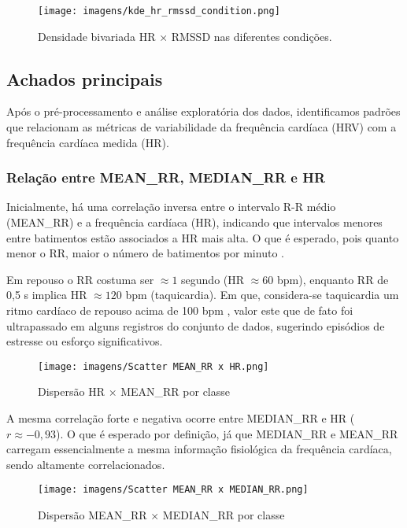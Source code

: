 \documentclass[conference]{IEEEtran}
\begin{document}
\begin{figure}[htbp]
    \centering
    \texttt{[image: imagens/kde\_hr\_rmssd\_condition.png]}
    \caption{Densidade bivariada HR × RMSSD nas diferentes condições.}
    \label{fig:kdrhr_rmssd}
\end{figure}

\subsection{Achados principais}

Após o pré-processamento e análise exploratória dos dados, identificamos padrões que relacionam as métricas de variabilidade da frequência cardíaca (HRV) com a frequência cardíaca medida (HR).

\subsubsection{Relação entre MEAN\_RR, MEDIAN\_RR e HR}

Inicialmente, há uma correlação inversa entre o intervalo R-R médio (MEAN\_RR) e a frequência cardíaca (HR), indicando que intervalos menores entre batimentos estão associados a HR mais alta. O que é esperado, pois quanto menor o RR, maior o número de batimentos por minuto \cite{R1}.

Em repouso o RR costuma ser $\approx1$ segundo (HR $\approx60$ bpm), enquanto RR de 0,5 s implica HR $\approx120$ bpm (taquicardia). Em que, considera-se taquicardia um ritmo cardíaco de repouso acima de 100 bpm \cite{R2}, valor este que de fato foi ultrapassado em alguns registros do conjunto de dados, sugerindo episódios de estresse ou esforço significativos.

\begin{figure}[htbp]
    \centering
    \texttt{[image: imagens/Scatter MEAN\_RR x HR.png]}
    \caption{Dispersão HR × MEAN\_RR por classe}
    \label{fig:hrmedian_rr}
\end{figure}

A mesma correlação forte e negativa ocorre entre MEDIAN\_RR e HR ($r\approx -0,93$). O que é esperado por definição, já que MEDIAN\_RR e MEAN\_RR carregam essencialmente a mesma informação fisiológica da frequência cardíaca, sendo altamente correlacionados.

\begin{figure}[htbp]
    \centering
    \texttt{[image: imagens/Scatter MEAN\_RR x MEDIAN\_RR.png]}
    \caption{Dispersão MEAN\_RR × MEDIAN\_RR por classe}
    \label{fig:hrmedian_rr}
\end{figure}
\end{document}

